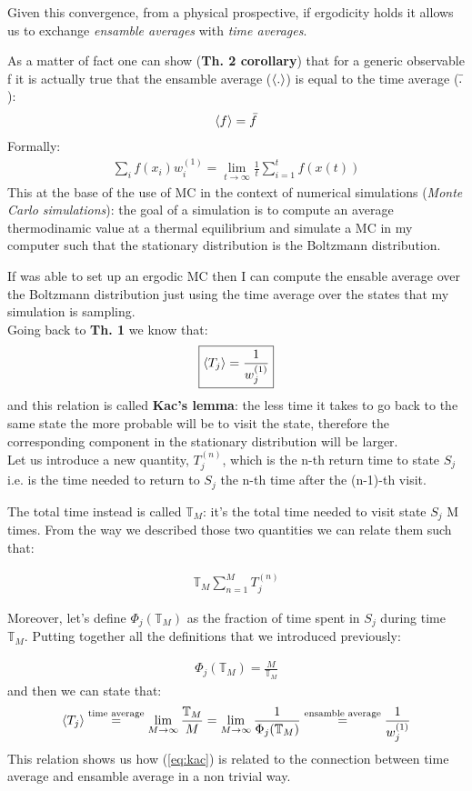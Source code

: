 \documentclass[\main/main.tex]{subfiles}
\begin{document}
Given this convergence, from a physical prospective, if ergodicity holds it allows us to exchange \textit{ensamble averages} with \textit{time averages}.

As a matter of fact one can show (\textbf{Th. 2 corollary}) that for a generic observable f it is actually true that the ensamble average ($\left\langle . \right\rangle$) is equal to the time average ($\Bar{.}$): 
\begin{eqnarray}
        \left\langle f \right\rangle=\Bar{f}
\end{eqnarray}
Formally:
\begin{align}
     \sum_i f(x_i)w_i^{(1)} = \lim_{t\to\infty}\frac{1}{t}\sum_{i=1}^{t}f(x(t))
\end{align}
This at the base of the use of MC in the context of numerical simulations (\textit{Monte Carlo simulations}): the goal of a simulation is to compute an average thermodinamic value at a thermal equilibrium and simulate a MC in my computer such that the stationary distribution is the Boltzmann distribution.

If  was able to set up an ergodic MC then I can compute the ensable average over the Boltzmann distribution just using the time average over the states that my simulation is sampling. \\

Going back to \textbf{Th. 1} we know that: 
\begin{align}
    \boxed{\left\langle T_j \right\rangle =\frac{1}{w_j^{(1)}}}   
    \label{eq:kac}
\end{align}
and this relation is called \textbf{Kac's lemma}: the less time it takes to go back to the same state the more probable will be to visit the state, therefore the corresponding component in the stationary distribution will be larger. \\

Let us introduce a new quantity, $T_j^{(n)}$, which is the n-th return time to state $S_j$ i.e. is the time needed to return to $S_j$ the n-th time after the (n-1)-th visit.

The total time instead is called $\mathbb{T}_M$: it's the total time needed to visit state $S_j$ M times. From the way we described those two quantities we can relate them such that:

\begin{eqnarray}
\mathbb{T}_M \sum_{n=1}^M T_j^{(n)}
\end{eqnarray}

Moreover, let's define $\Phi_j (\mathbb{T}_M)$ as the fraction of time spent in $S_j$ during time $\mathbb{T}_M$. Putting together all the definitions that we introduced previously:

\begin{eqnarray}
        \Phi_j(\mathbb{T}_M)=\frac{M}{\mathbb{T}_M}
\end{eqnarray}
and then we can state that:
\begin{eqnarray}
        \left\langle T_j \right\rangle\overset{\text{time average}}{=} \lim_{M\to\infty} \frac{\mathbb{T}_M}{M}= \lim_{M\to\infty}\frac{1}{\Phi_j(\mathbb{T}_M)}\overset{\text{ensamble average}}{=}\frac{1}{w_j^{(1)}}
\end{eqnarray}
This relation shows us how (\ref{eq:kac}) is related to the connection between time average and ensamble average in a non trivial way.
\end{document}
